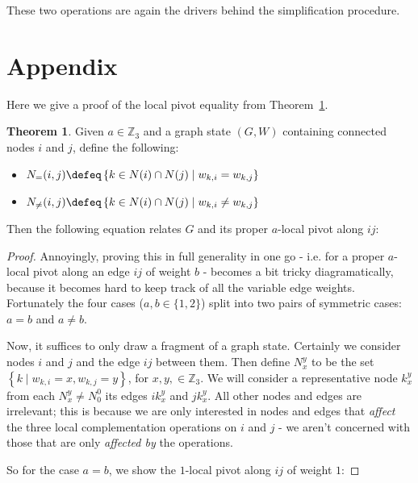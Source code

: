 \documentclass[11pt, oneside]{article}      %
\theoremstyle{definition}
\newtheorem{theorem}{Theorem}[section]
\begin{document}
These two operations are again the drivers behind the simplification procedure. 

\section{Appendix}

Here we give a proof of the local pivot equality from Theorem~\ref{thm:local_pivot_equality}.

\begin{theorem}\label{thm:local_pivot_equality}
	Given $a \in \mathbb{Z}_3$ and a graph state $(G, W)$ containing connected nodes $i$ and $j$, define the following:
	\begin{itemize}
		\item $N_{=}(i, j) \defeq \left\{k \in N(i) \cap N(j) \mid w_{k,i} = w_{k,j} \right\}$
		\item $N_{\neq}(i, j) \defeq \left\{k \in N(i) \cap N(j) \mid w_{k,i} \neq w_{k,j} \right\}$
	\end{itemize} 
	Then the following equation relates $G$ and its proper $a$-local pivot along $ij$:
	\begin{proof}
		Annoyingly, proving this in full generality in one go - i.e. for a proper $a$-local pivot along an edge $ij$ of weight $b$ - becomes a bit tricky diagramatically, because it becomes hard to keep track of all the variable edge weights. Fortunately the four cases ($a, b \in \{1,2\}$) split into two pairs of symmetric cases: $a = b$ and $a \neq b$.\newline

		Now, it suffices to only draw a fragment of a graph state. Certainly we consider nodes $i$ and $j$ and the edge $ij$ between them. Then define $N_x^y$ to be the set $\left\{k \mid w_{k,i} = x, w_{k,j} = y \right\}$, for $x, y, \in \mathbb{Z}_3$. We will consider a representative node $k_x^y$ from each $N_x^y \neq N_0^0$ its edges $ik_x^y$ and $jk_x^y$. All other nodes and edges are irrelevant; this is because we are only interested in nodes and edges that \textit{affect} the three local complementation operations on $i$ and $j$ - we aren't concerned with those that are only \textit{affected by} the operations.\newline

		So for the case $a=b$, we show the $1$-local pivot along $ij$ of weight $1$:\newline



	\end{proof}
\end{theorem}
\end{document}
